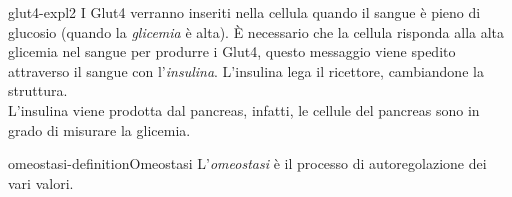 \documentclass[preview]{standalone}
\begin{document}

\begin{snippet}{glut4-expl2}
    I Glut4 verranno inseriti nella cellula quando il sangue è pieno di glucosio (quando la \textit{glicemia} è alta).
È necessario che la cellula risponda alla alta glicemia nel sangue per produrre i Glut4,
questo messaggio viene spedito attraverso il sangue con l'\textit{insulina}.
L'insulina lega il ricettore, cambiandone la struttura. \\
L'insulina viene prodotta dal pancreas, infatti, le cellule del pancreas sono in grado di misurare la glicemia.
\end{snippet}



\begin{snippetdefinition}{omeostasi-definition}{Omeostasi}
    L'\textit{omeostasi} è il processo di autoregolazione dei vari valori.
\end{snippetdefinition}




\end{document}
